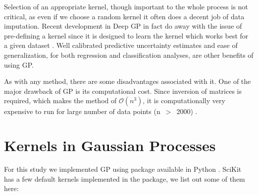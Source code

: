             Selection of an appropriate kernel, though important to the whole process is not
            critical, as even if we choose a random kernel it often does a decent job of data
            imputation.  Recent development in Deep GP in fact do away with the issue of
            pre-defining a kernel since it is designed to learn the kernel which works best for a
            given dataset \citep{Bui2016}. Well calibrated predictive uncertainty estimates and ease
            of generalization, for both regression and classification analyses, are other benefits
            of using GP.

            As with any method, there are some disadvantages associated with it. One of the major
            drawback of GP is its computational cost. Since inversion of matrices is required, which
            makes the method of $\mathcal{O}(n^3)$, it is computationally very expensive to run for
            large number of data points (n~$>$~2000) \citep{Gramacy2020}.

    \section{Kernels in Gaussian Processes} \label{sec:meth8}

        For this study we implemented GP using
         package
        available in Python \citep{Pedregosa2011}. SciKit has a few default kernels implemented in
        the package, we list out some of them here:


